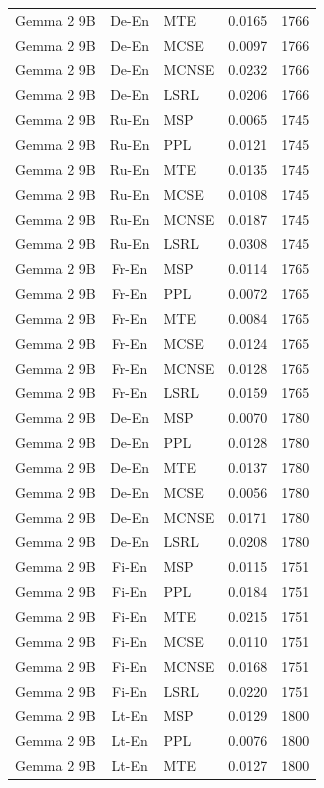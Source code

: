 \begin{table}
\begin{tabular}{lc}
Gemma 2 9B & De-En & MTE & 0.0165 & 1766 \\
Gemma 2 9B & De-En & MCSE & 0.0097 & 1766 \\
Gemma 2 9B & De-En & MCNSE & 0.0232 & 1766 \\
Gemma 2 9B & De-En & LSRL & 0.0206 & 1766 \\
Gemma 2 9B & Ru-En & MSP & 0.0065 & 1745 \\
Gemma 2 9B & Ru-En & PPL & 0.0121 & 1745 \\
Gemma 2 9B & Ru-En & MTE & 0.0135 & 1745 \\
Gemma 2 9B & Ru-En & MCSE & 0.0108 & 1745 \\
Gemma 2 9B & Ru-En & MCNSE & 0.0187 & 1745 \\
Gemma 2 9B & Ru-En & LSRL & 0.0308 & 1745 \\
Gemma 2 9B & Fr-En & MSP & 0.0114 & 1765 \\
Gemma 2 9B & Fr-En & PPL & 0.0072 & 1765 \\
Gemma 2 9B & Fr-En & MTE & 0.0084 & 1765 \\
Gemma 2 9B & Fr-En & MCSE & 0.0124 & 1765 \\
Gemma 2 9B & Fr-En & MCNSE & 0.0128 & 1765 \\
Gemma 2 9B & Fr-En & LSRL & 0.0159 & 1765 \\
Gemma 2 9B & De-En & MSP & 0.0070 & 1780 \\
Gemma 2 9B & De-En & PPL & 0.0128 & 1780 \\
Gemma 2 9B & De-En & MTE & 0.0137 & 1780 \\
Gemma 2 9B & De-En & MCSE & 0.0056 & 1780 \\
Gemma 2 9B & De-En & MCNSE & 0.0171 & 1780 \\
Gemma 2 9B & De-En & LSRL & 0.0208 & 1780 \\
Gemma 2 9B & Fi-En & MSP & 0.0115 & 1751 \\
Gemma 2 9B & Fi-En & PPL & 0.0184 & 1751 \\
Gemma 2 9B & Fi-En & MTE & 0.0215 & 1751 \\
Gemma 2 9B & Fi-En & MCSE & 0.0110 & 1751 \\
Gemma 2 9B & Fi-En & MCNSE & 0.0168 & 1751 \\
Gemma 2 9B & Fi-En & LSRL & 0.0220 & 1751 \\
Gemma 2 9B & Lt-En & MSP & 0.0129 & 1800 \\
Gemma 2 9B & Lt-En & PPL & 0.0076 & 1800 \\
Gemma 2 9B & Lt-En & MTE & 0.0127 & 1800 \\

\end{tabular}
\end{table}
